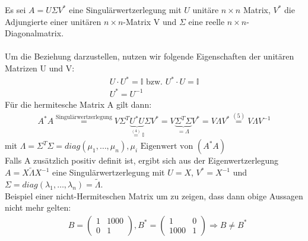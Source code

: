 Es sei $A=U\Sigma V^*$ eine Singulärwertzerlegung mit $U$ unitäre $n\times n$ Matrix, $V^*$ die Adjungierte einer unitären $n\times n$-Matrix V und $\Sigma$ eine reelle $n\times n$-Diagonalmatrix.\\\\
Um die Beziehung darzustellen, nutzen wir folgende Eigenschaften der unitären Matrizen U und V:
\begin{align}
U\cdot U^* =\mathbb{I} \text{ bzw. } U^* \cdot U=\mathbb{I}\\
U^*=U^{-1}
\end{align}
Für die hermitesche Matrix A gilt dann:
\begin{align}
A^*A\overset{\text{Singulärwertzerlegung}}{=} V\Sigma^T\underbrace{U^*U}_{\overset{(4)}{=}\mathbb{I}}\Sigma
V^* = V\underbrace{\Sigma^T\Sigma}_{=\Lambda}V^*=V\Lambda V^*\overset{(5)}{=}V\Lambda V^{-1}
\end{align}
mit $\Lambda=\Sigma^T \Sigma=diag(\mu_1,\ldots,\mu_n), \mu_i \text{ Eigenwert von } (A^*A)$\\
\newline
Falls A zusätzlich positiv definit ist, ergibt sich aus der Eigenwertzerlegung $A=X\tilde{\Lambda} X^{-1}$ eine Singulärwertzerlegung mit $U=X$, $V^*=X^{-1}$ und $\Sigma=diag(\lambda_1,\ldots,\lambda_n)=\tilde{\Lambda}$.\\
\newline
Beispiel einer nicht-Hermiteschen Matrix um zu zeigen, dass dann obige Aussagen nicht mehr gelten:
\begin{align*}
&B=
\begin{pmatrix}
	1 & 1000\\
	0 & 1
\end{pmatrix}, 
B^*=
\begin{pmatrix}
1 & 0\\
1000 & 1
\end{pmatrix}
\Rightarrow B\neq B^*\end{align*}
